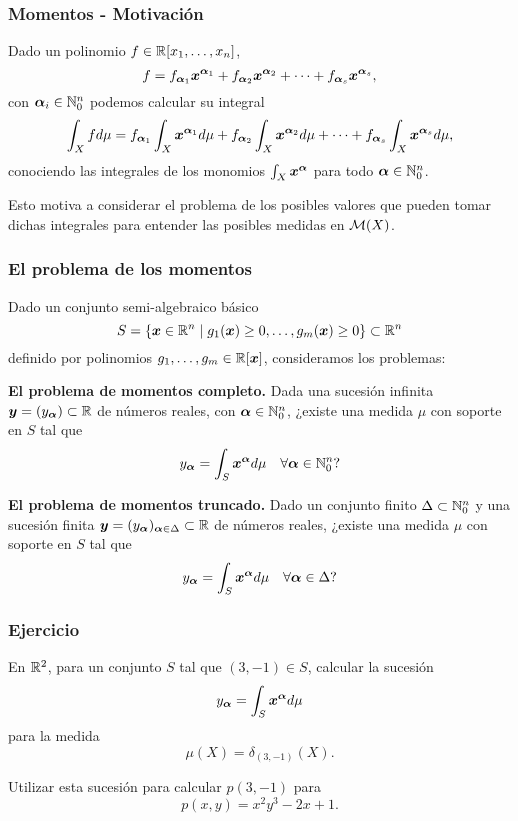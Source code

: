 \documentclass[aspectratio=169,12pt,spanish]{beamer}
\begin{document}

\begin{frame}

\frametitle{Momentos - Motivación}

Dado un polinomio $f \in \mathbb{R}[x_1, \dots, x_n]$,
$$
f = f_{\bm{\alpha}_1} \bm{x}^{\bm{\alpha}_1} + f_{\bm{\alpha}_2} \bm{x}^{\bm{\alpha}_2} + \dots + f_{\bm{\alpha}_s} \bm{x}^{\bm{\alpha}_s},
$$
con $\bm{\alpha}_i \in \mathbb{N}_0^n$ podemos calcular su integral
$$
\int_X f d\mu = f_{\bm{\alpha}_1} \int_X \bm{x}^{\bm{\alpha}_1} d\mu + f_{\bm{\alpha}_2} \int_X \bm{x}^{\bm{\alpha}_2} d\mu + \dots + f_{\bm{\alpha}_s} \int_X \bm{x}^{\bm{\alpha}_s}d\mu,
$$
conociendo las integrales de los monomios $\int_X \bm{x}^{\bm{\alpha}}$ para todo $\bm{\alpha} \in \mathbb{N}_0^n$.

Esto motiva a considerar el problema de los posibles valores que pueden tomar dichas integrales para entender las posibles medidas en ${\mathcal{M}(X)}$.

\end{frame}


\begin{frame}

\frametitle{El problema de los momentos}
Dado un conjunto semi-algebraico básico $$S = \{\bm{x} \in \mathbb{R}^n \mid g_1(\bm{x}) \ge 0, \dots, g_m(\bm{x}) \ge 0\} \subset \mathbb{R}^n$$
definido por polinomios $g_1, \dots, g_m \in \mathbb{R}[\bm{x}]$, consideramos los problemas:

\textbf{El problema de momentos completo.}
Dada una sucesión infinita $\bm{y} = (y_{\bm{\alpha}}) \subset \mathbb{R}$ de números reales, con $\bm{\alpha} \in \mathbb{N}_0^n$, ¿existe una medida $\mu$ con soporte en $S$ tal que
$$
y_{\bm{\alpha}} = \int_S \bm{x}^{\bm{\alpha}} d\mu \quad \forall \bm{\alpha} \in \mathbb{N}_0^n?
$$

\textbf{El problema de momentos truncado.}
Dado un conjunto finito $\Delta \subset \mathbb{N}_0^n$ y una sucesión finita $\bm{y} = (y_{\bm{\alpha}})_{\bm{\alpha} \in \Delta} \subset \mathbb{R}$ de números reales, ¿existe una medida $\mu$ con soporte en $S$ tal que
$$
y_{\bm{\alpha}} = \int_S \bm{x}^{\bm{\alpha}} d\mu \quad \forall \bm{\alpha} \in \Delta?
$$

\end{frame}


\begin{frame}

\frametitle{Ejercicio}

En $\mathbb{R}^2$, para un conjunto $S$ tal que $(3,-1) \in S$, calcular la sucesión
$$y_{\bm{\alpha}} = \int_S \bm{x}^{\bm{\alpha}} d\mu$$
 para la medida
$$\mu(X) = \delta_{(3,-1)}(X).$$

Utilizar esta sucesión para calcular $p(3,-1)$ para
$$p(x,y) = x^2y^3 - 2x + 1.$$

\end{frame}
\end{document}
